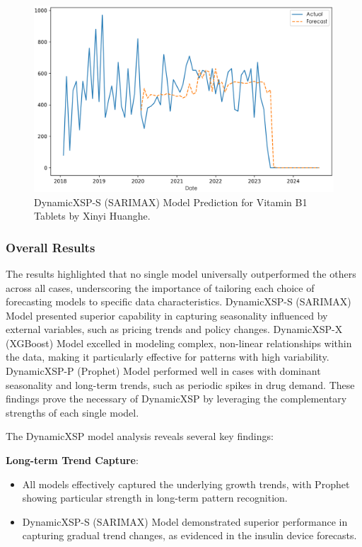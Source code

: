 \documentclass[journal]{IEEEtran}
\begin{document}
\begin{itemize}
\begin{figure}[H]
\centering
\includegraphics[width=\linewidth]{../Result_Paper/SARIMAX_Prediction_维生素B1片_信谊黄河.png}
\caption{DynamicXSP-S (SARIMAX) Model Prediction for Vitamin B1 Tablets by Xinyi Huanghe.}
\label{fig:vitaminb1}
\end{figure}
\end{itemize}

\subsubsection{Overall Results}

The results highlighted that no single model universally outperformed the others across all cases, underscoring the importance of tailoring each choice of forecasting models to specific data characteristics. DynamicXSP-S (SARIMAX) Model presented superior capability in capturing seasonality influenced by external variables, such as pricing trends and policy changes. DynamicXSP-X (XGBoost) Model excelled in modeling complex, non-linear relationships within the data, making it particularly effective for patterns with high variability. DynamicXSP-P (Prophet) Model performed well in cases with dominant seasonality and long-term trends, such as periodic spikes in drug demand. These findings prove the necessary of DynamicXSP by leveraging the complementary strengths of each single model. 

The DynamicXSP model analysis reveals several key findings:

\textbf{Long-term Trend Capture}:
\begin{itemize}
\item All models effectively captured the underlying growth trends, with Prophet showing particular strength in long-term pattern recognition.
\item DynamicXSP-S (SARIMAX) Model demonstrated superior performance in capturing gradual trend changes, as evidenced in the insulin device forecasts.
\end{itemize}
\end{document}
